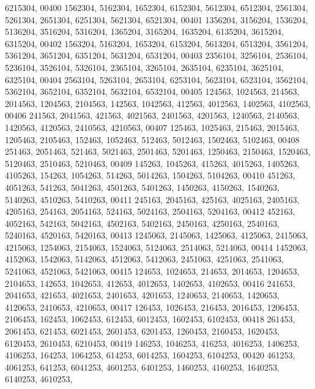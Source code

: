 \begin{DoxyCode}
      6215304,
00400       1562304, 5162304, 1652304, 6152304, 5612304, 6512304, 2561304, 5261304, 2651304, 6251304, 5621304, 
      6521304,
00401       1356204, 3156204, 1536204, 5136204, 3516204, 5316204, 1365204, 3165204, 1635204, 6135204, 3615204, 
      6315204,
00402       1563204, 5163204, 1653204, 6153204, 5613204, 6513204, 3561204, 5361204, 3651204, 6351204, 5631204, 
      6531204,
00403       2356104, 3256104, 2536104, 5236104, 3526104, 5326104, 2365104, 3265104, 2635104, 6235104, 3625104, 
      6325104,
00404       2563104, 5263104, 2653104, 6253104, 5623104, 6523104, 3562104, 5362104, 3652104, 6352104, 5632104, 
      6532104,
00405        124563, 1024563,  214563, 2014563, 1204563, 2104563,  142563, 1042563,  412563, 4012563, 1402563, 
      4102563,
00406        241563, 2041563,  421563, 4021563, 2401563, 4201563, 1240563, 2140563, 1420563, 4120563, 2410563, 
      4210563,
00407        125463, 1025463,  215463, 2015463, 1205463, 2105463,  152463, 1052463,  512463, 5012463, 1502463, 
      5102463,
00408        251463, 2051463,  521463, 5021463, 2501463, 5201463, 1250463, 2150463, 1520463, 5120463, 2510463, 
      5210463,
00409        145263, 1045263,  415263, 4015263, 1405263, 4105263,  154263, 1054263,  514263, 5014263, 1504263, 
      5104263,
00410        451263, 4051263,  541263, 5041263, 4501263, 5401263, 1450263, 4150263, 1540263, 5140263, 4510263, 
      5410263,
00411        245163, 2045163,  425163, 4025163, 2405163, 4205163,  254163, 2054163,  524163, 5024163, 2504163, 
      5204163,
00412        452163, 4052163,  542163, 5042163, 4502163, 5402163, 2450163, 4250163, 2540163, 5240163, 4520163, 
      5420163,
00413       1245063, 2145063, 1425063, 4125063, 2415063, 4215063, 1254063, 2154063, 1524063, 5124063, 2514063, 
      5214063,
00414       1452063, 4152063, 1542063, 5142063, 4512063, 5412063, 2451063, 4251063, 2541063, 5241063, 4521063, 
      5421063,
00415        124653, 1024653,  214653, 2014653, 1204653, 2104653,  142653, 1042653,  412653, 4012653, 1402653, 
      4102653,
00416        241653, 2041653,  421653, 4021653, 2401653, 4201653, 1240653, 2140653, 1420653, 4120653, 2410653, 
      4210653,
00417        126453, 1026453,  216453, 2016453, 1206453, 2106453,  162453, 1062453,  612453, 6012453, 1602453, 
      6102453,
00418        261453, 2061453,  621453, 6021453, 2601453, 6201453, 1260453, 2160453, 1620453, 6120453, 2610453, 
      6210453,
00419        146253, 1046253,  416253, 4016253, 1406253, 4106253,  164253, 1064253,  614253, 6014253, 1604253, 
      6104253,
00420        461253, 4061253,  641253, 6041253, 4601253, 6401253, 1460253, 4160253, 1640253, 6140253, 4610253, 

\end{DoxyCode}
